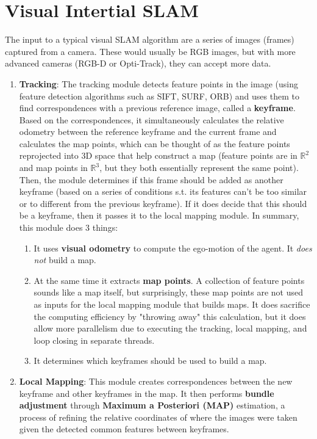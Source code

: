 \documentclass{article}
\newcounter{algo}[section]
\begin{document}
\section{Visual Intertial SLAM}

  The input to a typical visual SLAM algorithm are a series of images (frames) captured from a camera. These would usually be RGB images, but with more advanced cameras (RGB-D or Opti-Track), they can accept more data. 
  \begin{enumerate}
      \item \textbf{Tracking}: The tracking module detects feature points in the image (using feature detection algorithms such as SIFT, SURF, ORB) and uses them to find correspondences with a previous reference image, called a \textbf{keyframe}. Based on the correspondences, it simultaneously calculates the relative odometry between the reference keyframe and the current frame and calculates the map points, which can be thought of as the feature points reprojected into 3D space that help construct a map (feature points are in $\mathbb{R}^2$ and map points in $\mathbb{R}^3$, but they both essentially represent the same point). Then, the module determines if this frame should be added as another keyframe (based on a series of conditions s.t. its features can't be too similar or to different from the previous keyframe). If it does decide that this should be a keyframe, then it passes it to the local mapping module. In summary, this module does 3 things: 
      \begin{enumerate}
          \item It uses \textbf{visual odometry} to compute the ego-motion of the agent. It \textit{does not} build a map. 
          \item At the same time it extracts \textbf{map points}. A collection of feature points sounds like a map itself, but surprisingly, these map points are not used as inputs for the local mapping module that builds maps. It does sacrifice the computing efficiency by "throwing away" this calculation, but it does allow more parallelism due to executing the tracking, local mapping, and loop closing in separate threads. 
          \item It determines which keyframes should be used to build a map. 
      \end{enumerate}
      
      \item \textbf{Local Mapping}: This module creates correspondences between the new keyframe and other keyframes in the map. It then performs \textbf{bundle adjustment} through \textbf{Maximum a Posteriori (MAP)} estimation, a process of refining the relative coordinates of where the images were taken given the detected common features between keyframes. 
      

\end{enumerate}
\end{document}
